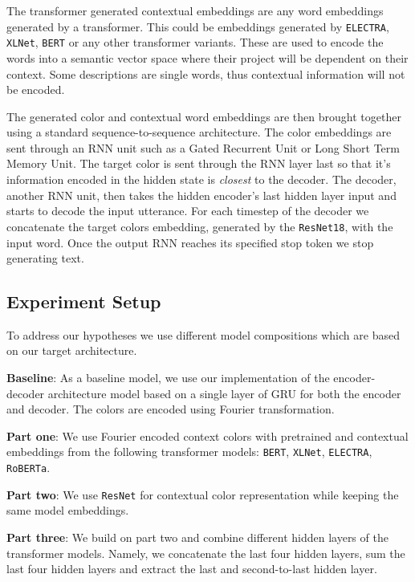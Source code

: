 \par
The transformer generated contextual embeddings are any word embeddings generated by a transformer. This could be embeddings generated by \texttt{ELECTRA}, \texttt{XLNet}, \texttt{BERT} or any other transformer variants. These are used to encode the words into a semantic vector space where their project will be dependent on their context. Some descriptions are single words, thus contextual information will not be encoded.

\par
The generated color and contextual word embeddings are then brought together using a standard sequence-to-sequence architecture. The color embeddings are sent through an RNN unit such as a Gated Recurrent Unit or Long Short Term Memory Unit. The target color is sent through the RNN layer last so that it’s information encoded in the hidden state is \emph{closest} to the decoder. The decoder, another RNN unit,  then takes the hidden encoder's last hidden layer input and starts to decode the input utterance. For each timestep of the decoder we concatenate the target colors embedding, generated by the \texttt{ResNet18}, with the input word. Once the output RNN reaches its specified stop token we stop generating text.

\subsection{Experiment Setup}
To address our hypotheses we use different model compositions which are based on our target architecture.

\textbf{Baseline}:
As a baseline model, we use our implementation of the encoder-decoder architecture model based on a single layer of GRU for both the encoder and decoder. The colors are encoded using Fourier transformation.

\textbf{Part one}:
We use Fourier encoded context colors with pretrained and contextual embeddings from the following transformer models: \texttt{BERT}, \texttt{XLNet}, \texttt{ELECTRA}, \texttt{RoBERTa}.

\textbf{Part two}:
We use \texttt{ResNet} for contextual color representation while keeping the same model embeddings.

\textbf{Part three}:
We build on part two and combine different hidden layers of the transformer models. Namely, we concatenate the last four hidden layers, sum the last four hidden layers and extract the last and second-to-last hidden layer.